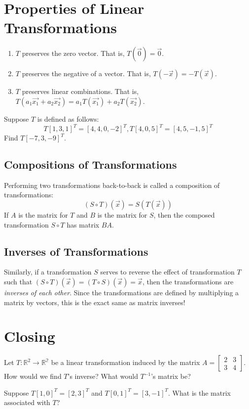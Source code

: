 \documentclass[11pt]{exam}
\begin{document}
\pagebreak
\section{Properties of Linear Transformations}
\vspace{20px}
\begin{enumerate}
    \item $T$ preserves the zero vector. That is, $T(\vec{0}) = \vec{0}$.
    \item $T$ preserves the negative of a vector. That is, $T(-\vec{x}) = -T(\vec{x})$.
    \item $T$ preserves linear combinations. That is, $T(a_1\vec{x_1} + a_2\vec{x_2}) = a_1T(\vec{x_1}) + a_2T(\vec{x_2})$.
\end{enumerate}

\begin{questions}
    \item Suppose $T$ is defined as follows:
    $$T[1,3,1]^T = [4,4,0,-2]^T, T[4,0,5]^T = [4,5,-1,5]^T$$
    Find $T[-7,3,-9]^T$.
\end{questions}

\vspace{20px}
\subsection{Compositions of Transformations}

Performing two transformations back-to-back is called a composition of transformations:
$$(S \circ T)(\vec{x}) = S(T(\vec{x}))$$
If $A$ is the matrix for $T$ and $B$ is the matrix for $S$, then the composed transformation $S \circ T$ has matrix $BA$.

\vspace{20px}
\subsection{Inverses of Transformations}

Similarly, if a transformation $S$ serves to reverse the effect of transformation $T$ such that $(S \circ T)(\vec{x}) = (T \circ S)(\vec{x}) = \vec{x}$,
then the transformations are \textit{inverses of each other}. Since the transformations are defined by multiplying a matrix by vectors, this is the
exact same as matrix inverses!

\pagebreak
\section{Closing}
\begin{questions}
    \item Let $T: \mathbb{R}^2 \rightarrow \mathbb{R^2}$ be a linear transformation induced by the matrix $A = \begin{bmatrix} 2 & 3 \\ 3 & 4 \end{bmatrix}$.
    How would we find $T$'s inverse? What would $T^{-1}$'s matrix be?
    \item Suppose $T[1,0]^T = [2,3]^T$ and $T[0,1]^T = [3,-1]^T$. What is the matrix associated with $T$?
\end{questions}
\end{document}
